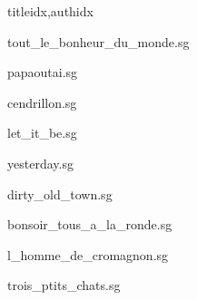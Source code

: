 \documentclass[
    fontsize=7pt
    ]{scrartcl}
\begin{document}
\begin{songs}{titleidx,authidx}

{tout_le_bonheur_du_monde.sg}


{papaoutai.sg}


{cendrillon.sg}


{let_it_be.sg}


{yesterday.sg}


{dirty_old_town.sg}


{bonsoir_tous_a_la_ronde.sg}


{l_homme_de_cromagnon.sg}


{trois_ptits_chats.sg}



\end{songs}
\end{document}
